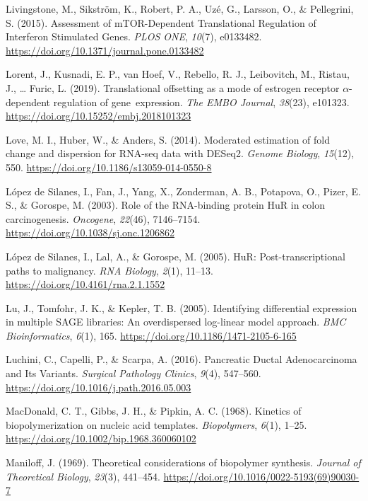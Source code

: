 \documentclass[12pt,openany]{book}
\begin{document}
\hypertarget{ref-Livingstone2015}{}
Livingstone, M., Sikström, K., Robert, P. A., Uzé, G., Larsson, O., \&
Pellegrini, S. (2015). Assessment of mTOR-Dependent Translational
Regulation of Interferon Stimulated Genes. \emph{PLOS ONE},
\emph{10}(7), e0133482.
\url{https://doi.org/10.1371/journal.pone.0133482}

\hypertarget{ref-Lorent2019}{}
Lorent, J., Kusnadi, E. P., van Hoef, V., Rebello, R. J., Leibovitch,
M., Ristau, J., \ldots{} Furic, L. (2019). Translational offsetting as a
mode of estrogen receptor \(\alpha\)-dependent regulation of
gene~expression. \emph{The EMBO Journal}, \emph{38}(23), e101323.
\url{https://doi.org/10.15252/embj.2018101323}

\hypertarget{ref-Love2014}{}
Love, M. I., Huber, W., \& Anders, S. (2014). Moderated estimation of
fold change and dispersion for RNA-seq data with DESeq2. \emph{Genome
Biology}, \emph{15}(12), 550.
\url{https://doi.org/10.1186/s13059-014-0550-8}

\hypertarget{ref-LopezdeSilanes2003}{}
López de Silanes, I., Fan, J., Yang, X., Zonderman, A. B., Potapova, O.,
Pizer, E. S., \& Gorospe, M. (2003). Role of the RNA-binding protein HuR
in colon carcinogenesis. \emph{Oncogene}, \emph{22}(46), 7146--7154.
\url{https://doi.org/10.1038/sj.onc.1206862}

\hypertarget{ref-LopezdeSilanes2005}{}
López de Silanes, I., Lal, A., \& Gorospe, M. (2005). HuR:
Post-transcriptional paths to malignancy. \emph{RNA Biology},
\emph{2}(1), 11--13. \url{https://doi.org/10.4161/rna.2.1.1552}

\hypertarget{ref-Lu2005}{}
Lu, J., Tomfohr, J. K., \& Kepler, T. B. (2005). Identifying
differential expression in multiple SAGE libraries: An overdispersed
log-linear model approach. \emph{BMC Bioinformatics}, \emph{6}(1), 165.
\url{https://doi.org/10.1186/1471-2105-6-165}

\hypertarget{ref-Luchini2016}{}
Luchini, C., Capelli, P., \& Scarpa, A. (2016). Pancreatic Ductal
Adenocarcinoma and Its Variants. \emph{Surgical Pathology Clinics},
\emph{9}(4), 547--560. \url{https://doi.org/10.1016/j.path.2016.05.003}

\hypertarget{ref-MacDonald1968a}{}
MacDonald, C. T., Gibbs, J. H., \& Pipkin, A. C. (1968). Kinetics of
biopolymerization on nucleic acid templates. \emph{Biopolymers},
\emph{6}(1), 1--25. \url{https://doi.org/10.1002/bip.1968.360060102}

\hypertarget{ref-Maniloff1969}{}
Maniloff, J. (1969). Theoretical considerations of biopolymer synthesis.
\emph{Journal of Theoretical Biology}, \emph{23}(3), 441--454.
\url{https://doi.org/10.1016/0022-5193(69)90030-7}
\end{document}
